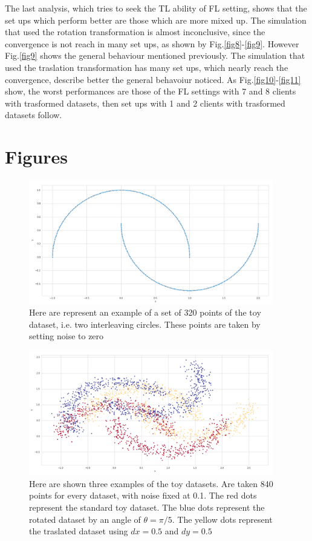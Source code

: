 \documentclass{article} %
\newcounter{points}
\newcounter{late}
\begin{document}
The last analysis, which tries to seek the TL ability of FL setting, shows that the 
set ups which perform better are those which are more mixed up.
The simulation that used the rotation transformation is almost inconclusive, since the 
convergence is not reach in many set ups, as shown by Fig.\ref{fig8}-\ref{fig9}.
However Fig.\ref{fig9} shows the general behaviour mentioned previously.
The simulation that used the traslation transformation has many set ups, which nearly reach 
the convergence, describe better the general behavoiur noticed.
As Fig.\ref{fig10}-\ref{fig11} show, the worst performances are those of the FL settings with 
7 and 8 clients with trasformed datasets, then set ups with 1 and 2 clients with trasformed 
datasets follow.


\section {Figures}
\begin{figure}[!ht]
    \centering
    \includegraphics[width=0.95\textwidth, keepaspectratio]{images/make_moons_example.png}
    \caption{Here are represent an example of a set of 320 points of the toy dataset, i.e.
        two interleaving circles. These points are taken by setting noise to zero}
    \label{fig1}
\end{figure}
\newpage
\begin{figure}[!ht]
    \centering
    \includegraphics[width=0.95\textwidth, keepaspectratio]{images/datasets_examples.png}
    \caption{Here are shown three examples of the toy datasets. Are taken 840 points for 
        every dataset, with noise fixed at 0.1. The red dots represent the standard toy 
        dataset. The blue dots represent the rotated dataset by an angle of $\theta=\pi/5$.
        The yellow dots represent the traslated dataset using $dx=0.5$ and $dy=0.5$}
    \label{fig2}
\end{figure}
\end{document}
